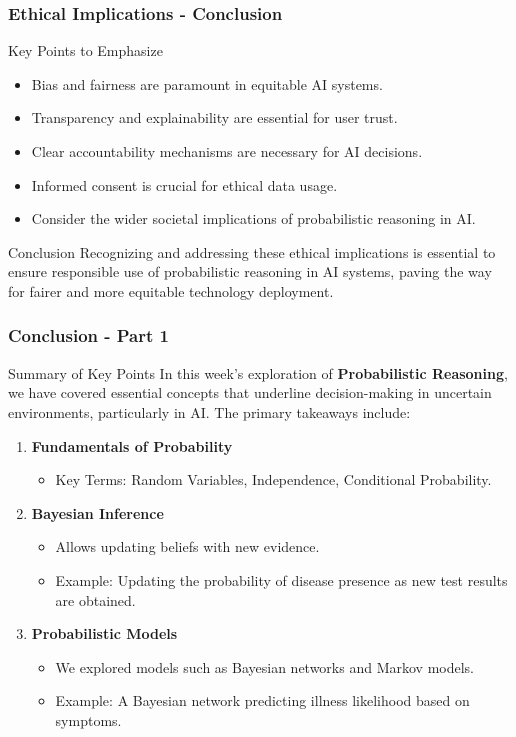 \documentclass[aspectratio=169]{beamer}
\begin{document}
\begin{frame}[fragile]
    \frametitle{Ethical Implications - Conclusion}
    \begin{block}{Key Points to Emphasize}
        \begin{itemize}
            \item Bias and fairness are paramount in equitable AI systems.
            \item Transparency and explainability are essential for user trust.
            \item Clear accountability mechanisms are necessary for AI decisions.
            \item Informed consent is crucial for ethical data usage.
            \item Consider the wider societal implications of probabilistic reasoning in AI.
        \end{itemize}
    \end{block}
    
    \begin{block}{Conclusion}
        Recognizing and addressing these ethical implications is essential to ensure responsible use of probabilistic reasoning in AI systems, paving the way for fairer and more equitable technology deployment.
    \end{block}
\end{frame}

\begin{frame}[fragile]
  \frametitle{Conclusion - Part 1}
  \begin{block}{Summary of Key Points}
    In this week's exploration of \textbf{Probabilistic Reasoning}, we have covered essential concepts that underline decision-making in uncertain environments, particularly in AI. The primary takeaways include:
  \end{block}

  \begin{enumerate}
    \item \textbf{Fundamentals of Probability}
      \begin{itemize}
        \item Key Terms: Random Variables, Independence, Conditional Probability.
      \end{itemize}
    \item \textbf{Bayesian Inference}
      \begin{itemize}
        \item Allows updating beliefs with new evidence.
        \item Example: Updating the probability of disease presence as new test results are obtained.
      \end{itemize}
    \item \textbf{Probabilistic Models}
      \begin{itemize}
        \item We explored models such as Bayesian networks and Markov models.
        \item Example: A Bayesian network predicting illness likelihood based on symptoms.
      \end{itemize}
  \end{enumerate}
\end{frame}
\end{document}
